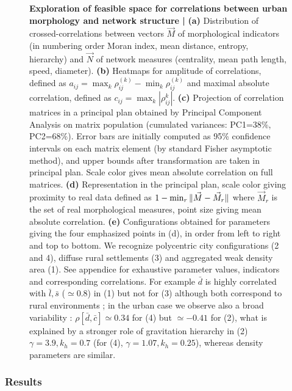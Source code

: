 \begin{figure}
\caption[Exploration of feasible space for correlations between urban morphology and network structure]{\footnotesize\textbf{Exploration of feasible space for correlations between urban morphology and network structure | } \textbf{(a)} Distribution of crossed-correlations between vectors $\vec{M}$ of morphological indicators (in numbering order Moran index, mean distance, entropy, hierarchy) and $\vec{N}$ of network measures (centrality, mean path length, speed, diameter). \textbf{(b)} Heatmaps for amplitude of correlations, defined as $a_{ij}=\max_k{\rho_{ij}^{(k)}}-\min_k{\rho_{ij}^{(k)}}$ and maximal absolute correlation, defined as $c_{ij}=\max_k\left| \rho_{ij}^{k} \right|$. \textbf{(c)} Projection of correlation matrices in a principal plan obtained by Principal Component Analysis on matrix population (cumulated variances: PC1=38\%, PC2=68\%). Error bars are initially computed as 95\% confidence intervals on each matrix element (by standard Fisher asymptotic method), and upper bounds after transformation are taken in principal plan. Scale color gives mean absolute correlation on full matrices. \textbf{(d)} Representation in the principal plan, scale color giving proximity to real data defined as $1 - \min_r \| \vec{M}-\vec{M}_r \|$ where $\vec{M}_r$ is the set of real morphological measures, point size giving mean absolute correlation. \textbf{(e)} Configurations obtained for parameters giving the four emphasized points in (d), in order from left to right and top to bottom. We recognize polycentric city configurations (2 and 4), diffuse rural settlements (3) and aggregated weak density area (1). See appendice for exhaustive parameter values, indicators and corresponding correlations. For example $\bar{d}$ is highly correlated with $\bar{l},\bar{s}$ ($\simeq$0.8) in (1) but not for (3) although both correspond to rural environments ; in the urban case we observe also a broad variability : $\rho[\bar{d},\bar{c}]\simeq 0.34$ for (4) but $\simeq-0.41$ for (2), what is explained by a stronger role of gravitation hierarchy in (2) $\gamma=3.9,k_h=0.7$ (for (4), $\gamma=1.07,k_h=0.25$), whereas density parameters are similar.}
\label{fig:densnwcor}
\end{figure}






\subsubsection{Results}


